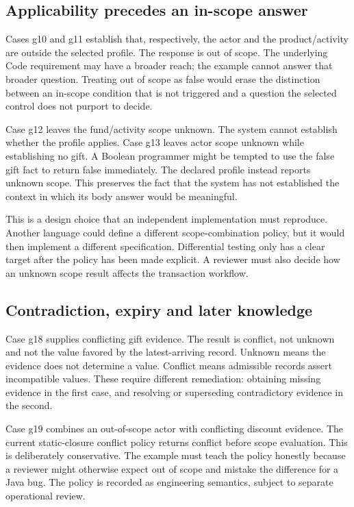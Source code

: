 \subsection{Applicability precedes an in-scope answer}
Cases g10 and g11 establish that, respectively, the actor and the product/activity
are outside the selected profile. The response is out of scope. The underlying
Code requirement may have a broader reach; the example cannot answer that
broader question. Treating out of scope as false would erase the distinction
between an in-scope condition that is not triggered and a question the selected
control does not purport to decide.

Case g12 leaves the fund/activity scope unknown. The system cannot establish
whether the profile applies. Case g13 leaves actor scope unknown while
establishing no gift. A Boolean programmer might be tempted to use the false
gift fact to return false immediately. The declared profile instead reports
unknown scope. This preserves the fact that the system has not established the
context in which its body answer would be meaningful.

This is a design choice that an independent implementation must reproduce.
Another language could define a different scope-combination policy, but it
would then implement a different specification. Differential testing only has
a clear target after the policy has been made explicit. A reviewer must also
decide how an unknown scope result affects the transaction workflow.

\subsection{Contradiction, expiry and later knowledge}
Case g18 supplies conflicting gift evidence. The result is conflict, not
unknown and not the value favored by the latest-arriving record. Unknown means
the evidence does not determine a value. Conflict means admissible records
assert incompatible values. These require different remediation: obtaining
missing evidence in the first case, and resolving or superseding contradictory
evidence in the second.

Case g19 combines an out-of-scope actor with conflicting discount evidence.
The current static-closure conflict policy returns conflict before scope
evaluation. This is deliberately conservative. The example must teach the
policy honestly because a reviewer might otherwise expect out of scope and
mistake the difference for a Java bug. The policy is recorded as engineering
semantics, subject to separate operational review.

